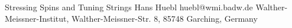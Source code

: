 \begin{conf-abstract}[]
{Stressing Spins and Tuning Strings}
{\color{blue} Hans Huebl}
{huebl@wmi.badw.de}
{Walther-Meissner-Institut, Walther-Meissner-Str. 8, 85748 Garching, Germany}
{\decofourleft \decofourright}





\printbibliography[heading=none]

\end{conf-abstract}
